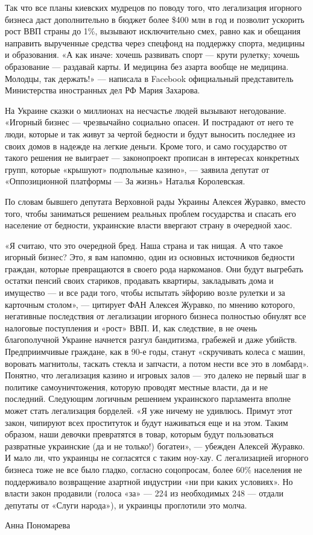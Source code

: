 Так что все планы киевских мудрецов по поводу того, что легализация игорного
бизнеса даст дополнительно в бюджет более \$400 млн в год и позволит ускорить
рост ВВП страны до 1\%, вызывают исключительно смех, равно как и обещания
направить вырученные средства через спецфонд на поддержку спорта, медицины и
образования. «А как иначе: хочешь развивать спорт — крути рулетку; хочешь
образование — раздавай карты. И медицина без азарта вообще не медицина.
Молодцы, так держать!» — написала в Facebook официальный представитель
Министерства иностранных дел РФ Мария Захарова.

На Украине сказки о миллионах на несчастье людей вызывают негодование. «Игорный
бизнес — чрезвычайно социально опасен. И пострадают от него те люди, которые и
так живут за чертой бедности и будут выносить последнее из своих домов в
надежде на легкие деньги. Кроме того, и само государство от такого решения не
выиграет — законопроект прописан в интересах конкретных групп, которые
«крышуют» подпольные казино», — заявила депутат от «Оппозиционной платформы —
За жизнь» Наталья Королевская.

По словам бывшего депутата Верховной рады Украины Алексея Журавко, вместо того,
чтобы заниматься решением реальных проблем государства и спасать его население
от бедности, украинские власти ввергают страну в очередной хаос.

«Я считаю, что это очередной бред. Наша страна и так нищая. А что такое игорный
бизнес? Это, я вам напомню, один из основных источников бедности граждан,
которые превращаются в своего рода наркоманов. Они будут выгребать остатки
пенсий своих стариков, продавать квартиры, закладывать дома и имущество — и все
ради того, чтобы испытать эйфорию возле рулетки и за карточным столом», —
цитирует ФАН Алексея Журавко, по мнению которого, негативные последствия от
легализации игорного бизнеса полностью обнулят все налоговые поступления и
«рост» ВВП. И, как следствие, в не очень благополучной Украине начнется разгул
бандитизма, грабежей и даже убийств. Предприимчивые граждане, как в 90-е годы,
станут «скручивать колеса с машин, воровать магнитолы, таскать стекла и
запчасти, а потом нести все это в ломбард».  Понятно, что легализация казино и
игровых залов — это далеко не первый шаг в политике самоуничтожения, которую
проводят местные власти, да и не последний. Следующим логичным решением
украинского парламента вполне может стать легализация борделей. «Я уже ничему
не удивлюсь. Примут этот закон, чипируют всех проституток и будут наживаться
еще и на этом. Таким образом, наши девочки превратятся в товар, которым будут
пользоваться развратные украинские (да и не только!) богатеи», — убежден
Алексей Журавко.  И мало ли, что украинцы не согласятся с таким ноу-хау. С
легализацией игорного бизнеса тоже не все было гладко, согласно соцопросам,
более 60\% населения не поддерживало возвращение азартной индустрии «ни при
каких условиях». Но власти закон продавили (голоса «за» — 224 из необходимых
248 — отдали депутаты от «Слуги народа»), и украинцы проглотили это молча.

Анна Пономарева
